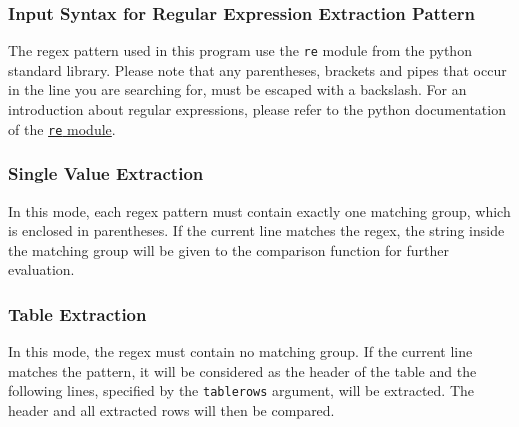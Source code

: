 \documentclass[a4paper,12pt]{scrartcl}
\begin{document}
\subsubsection*{Input Syntax for Regular Expression Extraction Pattern}
The regex pattern used in this program use the \texttt{re} module from the python standard library. Please note that
any parentheses, brackets and pipes that occur in the line you are searching for, must be escaped with a backslash.
For an introduction about regular expressions, please refer to the python documentation of the
\href{https://docs.python.org/3.2/library/re.html}{\texttt{re} module}.

\subsubsection*{Single Value Extraction}
In this mode, each regex pattern must contain exactly one matching group, which is enclosed in parentheses. If
the current line matches the regex, the string inside the matching group will be given to the comparison function
for further evaluation.

\subsubsection*{Table Extraction}
In this mode, the regex must contain no matching group. If the current line matches the pattern, it will be
considered as the header of the table and the following lines, specified by the \texttt{tablerows} argument, will be
extracted. The header and all extracted rows will then be compared.
\end{document}
